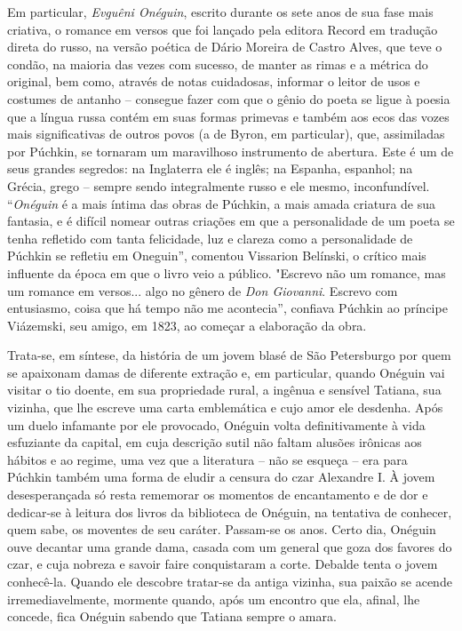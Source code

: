 Em particular, \emph{Evguêni Onéguin}, escrito durante os sete anos de
sua fase mais criativa, o romance em versos que foi lançado pela editora
Record em tradução direta do russo, na versão poética de Dário Moreira
de Castro Alves, que teve o condão, na maioria das vezes com sucesso, de
manter as rimas e a métrica do original, bem como, através de notas
cuidadosas, informar o leitor de usos e costumes de antanho -- consegue
fazer com que o gênio do poeta se ligue à poesia que a língua russa
contém em suas formas primevas e também aos ecos das vozes mais
significativas de outros povos (a de Byron, em particular), que,
assimiladas por Púchkin, se tornaram um maravilhoso instrumento de
abertura. Este é um de seus grandes segredos: na Inglaterra ele é
inglês; na Espanha, espanhol; na Grécia, grego -- sempre sendo
integralmente russo e ele mesmo, inconfundível. ``\emph{Onéguin} é a
mais íntima das obras de Púchkin, a mais amada criatura de sua fantasia,
e é difícil nomear outras criações em que a personalidade de um poeta se
tenha refletido com tanta felicidade, luz e clareza como a personalidade
de Púchkin se refletiu em Oneguin'', comentou Vissarion Belínski, o
crítico mais influente da época em que o livro veio a público. "Escrevo
não um romance, mas um romance em versos... algo no gênero de \emph{Don
Giovanni}. Escrevo com entusiasmo, coisa que há tempo não me
acontecia'', confiava Púchkin ao príncipe Viázemski, seu amigo, em 1823,
ao começar a elaboração da obra.

Trata-se, em síntese, da história de um jovem blasé de São Petersburgo
por quem se apaixonam damas de diferente extração e, em particular,
quando Onéguin vai visitar o tio doente, em sua propriedade rural, a
ingênua e sensível Tatiana, sua vizinha, que lhe escreve uma carta
emblemática e cujo amor ele desdenha. Após um duelo infamante por ele
provocado, Onéguin volta definitivamente à vida esfuziante da capital,
em cuja descrição sutil não faltam alusões irônicas aos hábitos e ao
regime, uma vez que a literatura -- não se esqueça -- era para Púchkin
também uma forma de eludir a censura do czar Alexandre I. À jovem
desesperançada só resta rememorar os momentos de encantamento e de dor e
dedicar-se à leitura dos livros da biblioteca de Onéguin, na tentativa
de conhecer, quem sabe, os moventes de seu caráter. Passam-se os anos.
Certo dia, Onéguin ouve decantar uma grande dama, casada com um general
que goza dos favores do czar, e cuja nobreza e savoir faire conquistaram
a corte. Debalde tenta o jovem conhecê-la. Quando ele descobre tratar-se
da antiga vizinha, sua paixão se acende irremediavelmente, mormente
quando, após um encontro que ela, afinal, lhe concede, fica Onéguin
sabendo que Tatiana sempre o amara.


